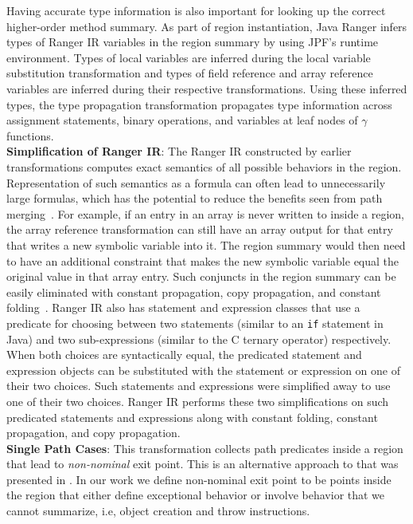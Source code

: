 %
Having accurate type information is also important for looking up the correct higher-order method summary.
%
As part of region instantiation, Java Ranger infers types of Ranger IR variables in the region summary by
using JPF's runtime environment.
%
Types of local variables are inferred during the local variable substitution transformation and types of field reference
and array reference variables are inferred during their respective transformations.
%
Using these inferred types, the type propagation transformation propagates type information across assignment
statements, binary operations, and variables at leaf nodes of $\gamma$ functions.\\
%
\textbf{Simplification of Ranger IR}: The Ranger IR constructed by earlier transformations computes exact semantics
of all possible behaviors in the region.
%
Representation of such semantics as a formula can often lead to unnecessarily large formulas, which has the potential to
reduce the benefits seen from path merging~\cite{angr}.
%
For example, if an entry in an array is never written to inside a region, the array reference transformation can still have an
array output for that entry that writes a new symbolic variable into it.
%
The region summary would then need to have an additional constraint that makes the new symbolic variable equal the
original value in that array entry.
%
Such conjuncts in the region summary can be easily eliminated with constant propagation, copy propagation, and constant
folding~\cite{dragon-book}.
%
Ranger IR also has statement and expression classes that use a predicate for choosing between two statements (similar to
an {\tt if} statement in Java) and two sub-expressions (similar to the C ternary operator) respectively.
%
When both choices are syntactically equal, the predicated statement and expression objects can be substituted with the
statement or expression on one of their two choices.
%
Such statements and expressions were simplified away to use one of their two choices.
%
Ranger IR performs these two simplifications on such predicated statements and expressions along with constant folding,
constant propagation, and copy propagation.\\
\textbf{Single Path Cases}: This transformation collects path predicates inside a region that lead to
\textit{non-nominal} exit point.
%
This is an alternative approach to that was presented in \cite{veritesting}.
%
In our work we define non-nominal exit point to be points inside the region that either define exceptional behavior or
involve behavior that we cannot summarize, i.e, object creation and throw instructions.
